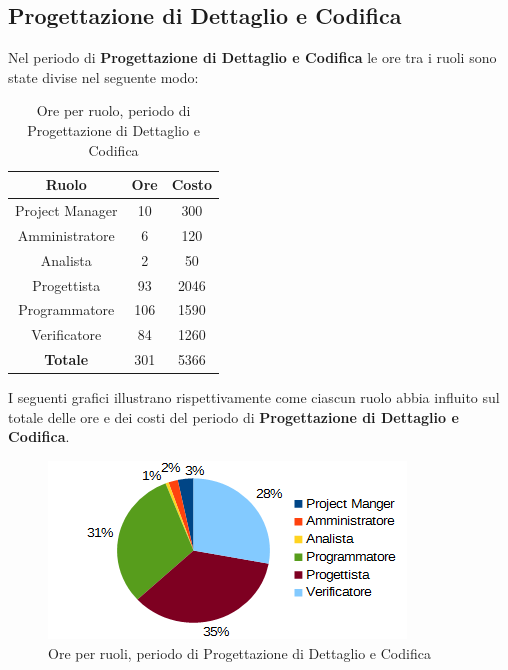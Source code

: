 	\subsection{Progettazione di Dettaglio e Codifica}
	Nel periodo di \textbf{Progettazione di Dettaglio e Codifica} le ore tra i ruoli sono state divise nel seguente modo: \\
	\begin{table}[H]
		\centering
		\begin{tabular}{|c|c|c|}
			\hline
			\textbf{Ruolo}		& \textbf{Ore}	& \textbf{Costo} \\
			\hline
			Project Manager		& 10			& 300	\\
			Amministratore		& 6				& 120	\\
			Analista			& 2				& 50	\\
			Progettista			& 93			& 2046	\\
			Programmatore		& 106			& 1590	\\
			Verificatore		& 84			& 1260	\\
			\hline
			\textbf{Totale}		& 301			& 5366	\\
			\hline
		\end{tabular}
		\caption{Ore per ruolo, periodo di Progettazione di Dettaglio e Codifica}
		\end{table}
	I seguenti grafici illustrano rispettivamente come ciascun ruolo abbia influito sul totale
delle ore e dei costi del periodo di \textbf{Progettazione di Dettaglio e Codifica}. \\
	\begin{figure}[H]
		\centering
		\includegraphics[width=1\linewidth]{immagini/grafici/progettazione_dettaglio_codifica-torta.png}
		\caption{Ore per ruoli, periodo di Progettazione di Dettaglio e Codifica}
	\end{figure}
